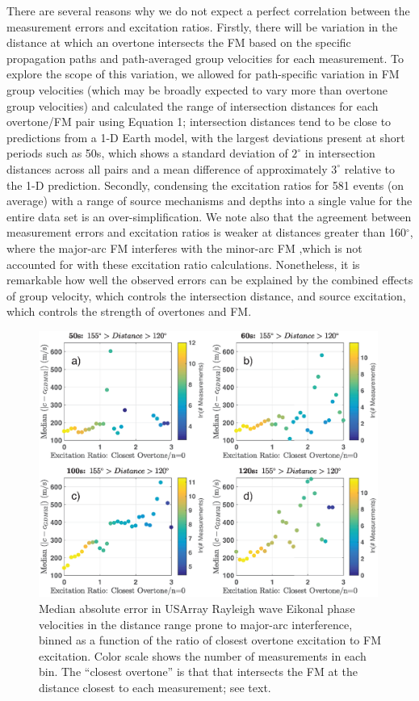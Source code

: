 \documentclass[extra,mreferee]{gji}
\begin{document}
There are several reasons why we do not expect a perfect correlation between the measurement errors and excitation ratios. Firstly, there will be variation in the distance at which an overtone intersects the FM based on the specific propagation paths and path-averaged group velocities for each measurement. To explore the scope of this variation, we allowed for path-specific variation in FM group velocities (which may be broadly expected to vary more than overtone group velocities) and calculated the range of intersection distances for each overtone/FM pair using Equation 1; intersection distances tend to be close to predictions from a 1-D Earth model, with the largest deviations present at short periods such as 50s, which shows a standard deviation of $2^\circ$ in intersection distances across all pairs and a mean difference of approximately $3^\circ$ relative to the 1-D prediction. Secondly, condensing the excitation ratios for 581 events (on average) with a range of source mechanisms and depths into a single value for the entire data set is an over-simplification. We note also that the agreement between measurement errors and excitation ratios is weaker at distances greater than 160$^\circ$, where the major-arc FM interferes with the minor-arc FM \citep[e.g.][]{levshin2005minor},which is not accounted for with these excitation ratio calculations. Nonetheless, it is remarkable how well the observed errors can be explained by the combined effects of group velocity, which controls the intersection distance, and source excitation, which controls the strength of overtones and FM. 

\begin{figure}
 \includegraphics[width=0.99\textwidth]{Fig15_Sver.eps}
 \caption{Median absolute error in USArray Rayleigh wave Eikonal phase velocities in the distance range prone to major-arc interference, binned as a function of the ratio of closest overtone excitation to FM excitation. Color scale shows the number of measurements in each bin. The ``closest overtone'' is that that intersects the FM at the distance closest to each measurement; see text.}
\end{figure}
\end{document}
